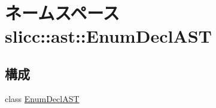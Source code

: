 \hypertarget{namespaceslicc_1_1ast_1_1EnumDeclAST}{
\section{ネームスペース slicc::ast::EnumDeclAST}
\label{namespaceslicc_1_1ast_1_1EnumDeclAST}
}
\subsection*{構成}
\begin{DoxyCompactItemize}
\item 
class \hyperlink{classslicc_1_1ast_1_1EnumDeclAST_1_1EnumDeclAST}{EnumDeclAST}
\end{DoxyCompactItemize}
